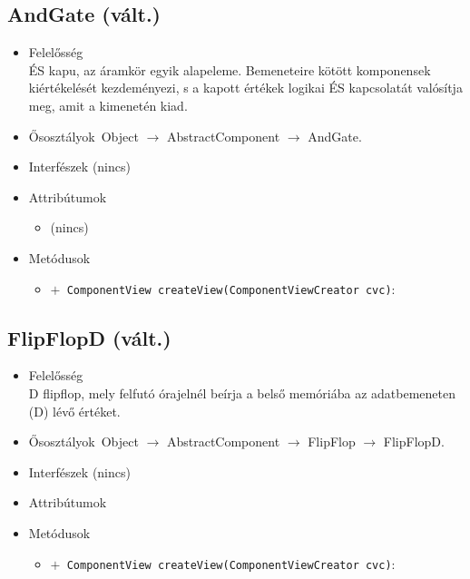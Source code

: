 \subsection{AndGate (vált.)}
\begin{itemize}
\item Felelősség\\
ÉS kapu, az áramkör egyik alapeleme. Bemeneteire kötött komponensek  kiértékelését kezdeményezi, s a kapott értékek logikai ÉS kapcsolatát  valósítja meg, amit a kimenetén kiad.
\item Ősosztályok\ Object $\rightarrow{}$ AbstractComponent $\rightarrow{}$ AndGate.
\item Interfészek (nincs)
\item Attribútumok $\ $
\begin{itemize}
\item (nincs)
\end{itemize}
\item Metódusok$\ $
\begin{itemize}
	\item[] \texttt{$+$ ComponentView createView(ComponentViewCreator cvc)}: 
\end{itemize}
\end{itemize}

\subsection{FlipFlopD (vált.)}
\begin{itemize}
\item Felelősség\\
D flipflop, mely felfutó órajelnél beírja a belső memóriába az adatbemeneten (D)  lévő értéket.
\item Ősosztályok\ Object $\rightarrow{}$ AbstractComponent $\rightarrow{}$ FlipFlop $\rightarrow{}$ FlipFlopD.
\item Interfészek (nincs)
\item Attribútumok $\ $
\item Metódusok$\ $
\begin{itemize}
	\item[] \texttt{$+$ ComponentView createView(ComponentViewCreator cvc)}: 
\end{itemize}
\end{itemize}

